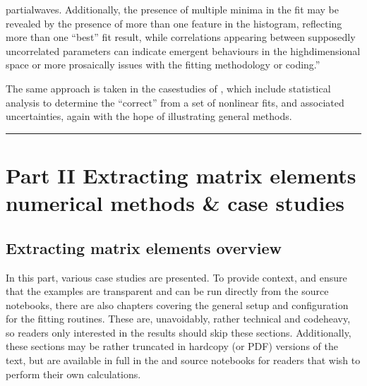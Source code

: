 \documentclass[letterpaper,table,10pt,english]{jupyterBook}
\begin{document}
partial\sphinxhyphen{}waves. Additionally, the presence of multiple minima in the fit may be revealed by the presence of more than one feature in the histogram, reflecting more than one “best” fit result, while correlations appearing between supposedly uncorrelated parameters can indicate emergent behaviours in the high\sphinxhyphen{}dimensional space or \sphinxhyphen{} more prosaically \sphinxhyphen{} issues with the fitting methodology or coding.”

\sphinxAtStartPar
The same approach is taken in the case\sphinxhyphen{}studies of {\hyperref[\detokenize{part2/extracting_matrix_elements_overview_270423:chpt-extracting-matrix-elements-overview}]{}}, which include statistical analysis to determine the “correct” {\hyperref[\detokenize{backmatter/glossary:term-radial-matrix-elements}]{}} from a set of non\sphinxhyphen{}linear fits, and associated uncertainties, again with the hope of illustrating general methods.


\bigskip\hrule\bigskip


\sphinxstepscope


\part{Part II \sphinxhyphen{} Extracting matrix elements \sphinxhyphen{} numerical methods \& case studies}

\sphinxstepscope


\chapter{Extracting matrix elements overview}
\label{\detokenize{part2/extracting_matrix_elements_overview_270423:extracting-matrix-elements-overview}}\label{\detokenize{part2/extracting_matrix_elements_overview_270423:chpt-extracting-matrix-elements-overview}}\label{\detokenize{part2/extracting_matrix_elements_overview_270423::doc}}
\sphinxAtStartPar
In this part, various case studies are presented. To provide context, and ensure that the examples are transparent and can be run directly from the source notebooks, there are also chapters covering the general setup and configuration for the fitting routines. These are, unavoidably, rather technical and code\sphinxhyphen{}heavy, so readers only interested in the results should skip these sections. Additionally, these sections may be rather truncated in hard\sphinxhyphen{}copy (or PDF) versions of the text, but are available in full in the  and source notebooks for readers that wish to perform their own calculations.
\end{document}
